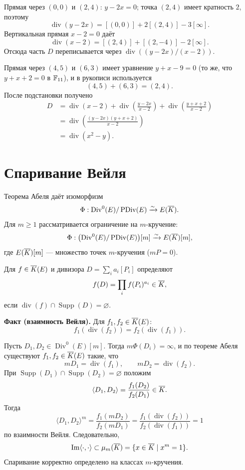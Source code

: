 \documentclass[12pt,a4paper]{article}
\newcommand{\Div}{\operatorname{Div}}\newcommand{\PDiv}{\operatorname{PDiv}}\newcommand{\ord}{\operatorname{ord}}\newcommand{\Supp}{\operatorname{Supp}}
\begin{document}
Прямая через $(0,0)$ и $(2,4)$: $y-2x=0$; точка $(2,4)$ имеет кратность $2$, поэтому
\[\operatorname{div}(y-2x)=[(0,0)]+2[(2,4)]-3[\infty].\]
Вертикальная прямая $x-2=0$ даёт
\[\operatorname{div}(x-2)=[(2,4)]+[(2,-4)]-2[\infty].\]
Отсюда часть $D$ переписывается через $\operatorname{div}((y-2x)/(x-2))$.

Прямая через $(4,5)$ и $(6,3)$ имеет уравнение $y+x-9=0$ (то же, что $y+x+2=0$ в $\mathbb F_{11}$), и в рукописи используется
\[(4,5)+(6,3)=(2,4).\]
После подстановки получено
\begin{align*}
D&=\operatorname{div}(x-2)+\operatorname{div}\left(\frac{y-2x}{x-2}\right)+\operatorname{div}\left(\frac{y+x+2}{x-2}\right)\\
&=\operatorname{div}\left(\frac{(y-2x)(y+x+2)}{x-2}\right)\\
&=\operatorname{div}(x^2-y).
\end{align*}
\section{Спаривание Вейля}
Теорема Абеля даёт изоморфизм
\[\Phi:\Div^0(E)/\PDiv(E)\xrightarrow{\sim}E(\Kbar).\]
Для $m\ge1$ рассматривается ограничение на $m$-кручение:
\[\Phi:\bigl(\Div^0(E)/\PDiv(E)\bigr)[m]\xrightarrow{\sim}E(\Kbar)[m],\]
где $E(\overline K)[m]$ --- множество точек $m$-кручения ($mP=0$).

Для $f\in\overline K(E)$ и дивизора $D=\sum_i a_i[P_i]$ определяют
\[f(D)=\prod_i f(P_i)^{a_i}\in\overline K,\]
если $\operatorname{div}(f)\cap\Supp(D)=\varnothing$.

\textbf{Факт (взаимность Вейля).} Для $f_1,f_2\in\overline K(E)$:
\[f_1(\operatorname{div}(f_2))=f_2(\operatorname{div}(f_1)).\]

Пусть $D_1,D_2\in\Div^0(E)[m]$. Тогда $m\Phi(D_i)=\infty$, и по теореме Абеля существуют $f_1,f_2\in\overline K(E)$ такие, что
\[mD_1=\operatorname{div}(f_1),\qquad mD_2=\operatorname{div}(f_2).\]
При $\Supp(D_1)\cap\Supp(D_2)=\varnothing$ положим
\[\langle D_1,D_2\rangle=\frac{f_1(D_2)}{f_2(D_1)}\in\overline K.\]
Тогда
\[\langle D_1,D_2\rangle^m=\frac{f_1(mD_2)}{f_2(mD_1)}=\frac{f_1(\operatorname{div}(f_2))}{f_2(\operatorname{div}(f_1))}=1\]
по взаимности Вейля. Следовательно,
\[\operatorname{Im}\langle\cdot,\cdot\rangle\subset\mu_m(\overline K)=\{x\in\overline K\mid x^m=1\}.\]
Спаривание корректно определено на классах $m$-кручения.
\end{document}
